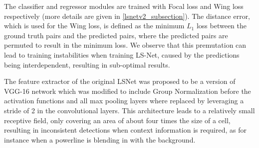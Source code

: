 \documentclass[journal]{IEEEtran}
\begin{document}
The classifier and regressor modules are trained with Focal loss \cite{focal_loss} and Wing loss \cite{wing_loss} respectively (more details are given in \ref{lsnetv2_subsection}). The distance error, which is used for the Wing loss, is defined as the minimum $L_1$ loss between the ground truth pairs and the predicted pairs, where the predicted pairs are permuted to result in the minimum loss. We observe that this premutation can lead to training instabilities when training LS-Net, caused by the predictions being interdependent, resulting in sub-optimal results.

The feature extractor of the original LSNet was proposed to be a version of VGG-16 network \cite{vgg} which was modified to include Group Normalization \cite{group_norm} before the activation functions and all max pooling layers where replaced by leveraging a stride of 2 in the convolutional layers. 
This architecture leads to a relatively small receptive field,  only covering an area of about four times the size of a cell, resulting in inconsistent detections when context information is required, as for instance when a powerline is blending in with the background.
\end{document}
